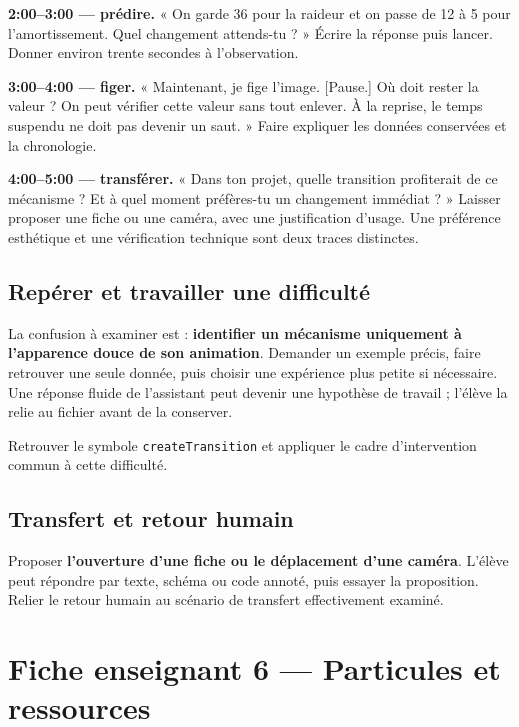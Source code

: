 \documentclass[
  canadien,
  11pt,
  a4paper,
]{report}
\begin{document}
\textbf{2:00--3:00 --- prédire.} « On garde 36 pour la raideur et on
passe de 12 à 5 pour l'amortissement. Quel changement attends-tu ? »
Écrire la réponse puis lancer. Donner environ trente secondes à
l'observation.

\textbf{3:00--4:00 --- figer.} « Maintenant, je fige l'image.
{[}Pause.{]} Où doit rester la valeur ? On peut vérifier cette valeur
sans tout enlever. À la reprise, le temps suspendu ne doit pas devenir
un saut. » Faire expliquer les données conservées et la chronologie.

\textbf{4:00--5:00 --- transférer.} « Dans ton projet, quelle transition
profiterait de ce mécanisme ? Et à quel moment préfères-tu un changement
immédiat ? » Laisser proposer une fiche ou une caméra, avec une
justification d'usage. Une préférence esthétique et une vérification
technique sont deux traces distinctes.

\section{Repérer et travailler une
difficulté}\label{repuxe9rer-et-travailler-une-difficultuxe9-4}

La confusion à examiner est : \textbf{identifier un mécanisme uniquement
à l'apparence douce de son animation}. Demander un exemple précis, faire
retrouver une seule donnée, puis choisir une expérience plus petite si
nécessaire. Une réponse fluide de l'assistant peut devenir une hypothèse
de travail ; l'élève la relie au fichier avant de la conserver.

Retrouver le symbole \texttt{create\allowbreak{}Transition} et appliquer le cadre
d'intervention commun à cette difficulté.

\section{Transfert et retour humain}\label{transfert-et-retour-humain-4}

Proposer \textbf{l'ouverture d'une fiche ou le déplacement d'une
caméra}. L'élève peut répondre par texte, schéma ou code annoté, puis
essayer la proposition. Relier le retour humain au scénario de transfert
effectivement examiné.

\chapter{Fiche enseignant 6 --- Particules et
ressources}\label{fiche-enseignant-6-particules-et-ressources}
\end{document}

